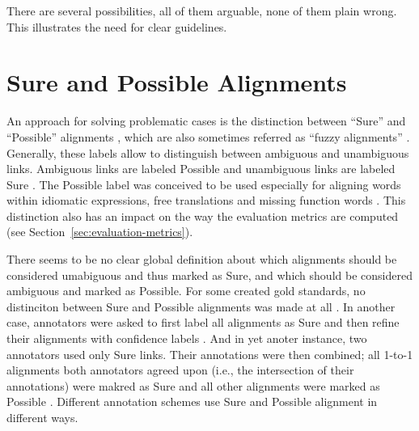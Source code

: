 There are several possibilities, all of them arguable, none of them plain wrong. This illustrates the need for clear guidelines.

\section{Sure and Possible Alignments}
\label{sec:sure_possible}
An approach for solving problematic cases is the distinction between \enquote{Sure} and \enquote{Possible} alignments \autocite{och-ney-2000-improved}, which are also sometimes referred as \enquote{fuzzy alignments} \autocite{clematide2018}. 
Generally, these labels allow to distinguish between ambiguous and unambiguous links. 
Ambiguous links are labeled Possible and unambiguous links are labeled Sure \autocite{lambert2005}. 
The Possible label was conceived to be used especially for aligning words within idiomatic expressions, free translations and missing function words \autocite{och-ney-2000-improved}.
This distinction also has an impact on the way the evaluation metrics are computed (see Section~\ref{sec:evaluation-metrics}).

There seems to be no clear global definition about which alignments should be considered  umabiguous and thus marked as Sure, and which should be considered ambiguous and  marked as Possible. 
For some created gold standards, no distinciton between Sure and Possible alignments was made at all \autocite{clematide2018}. 
In another case, annotators were asked to first label all alignments as Sure and then refine their alignments with confidence labels \autocite{holmqvist-ahrenberg-2011-gold}. 
And in yet anoter instance, two annotators used only Sure links. 
Their annotations were then combined; all 1-to-1 alignments both annotators agreed upon (i.e., the intersection of their annotations) were makred as Sure and all other alignments were marked as Possible \autocite{steingrimsson-etal-2021-combalign}. Different annotation schemes use Sure and Possible alignment in different ways.


